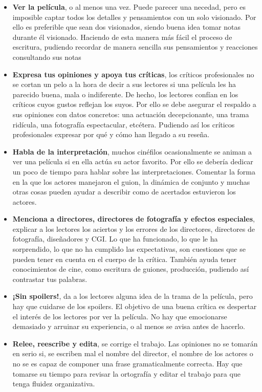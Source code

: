 \begin{itemize}
\item \textbf{Ver la película}, o al menos una vez. Puede parecer una necedad, pero es imposible captar todos los detalles y pensamientos con un solo visionado. Por ello es preferible que sean dos visionados, siendo buena idea tomar notas durante él visionado. Haciendo de esta manera más fácil el proceso de escritura, pudiendo recordar de manera sencilla sus pensamientos y reacciones consultando sus notas 
\item \textbf{Expresa tus opiniones y apoya tus críticas}, los críticos profesionales no se cortan un pelo a la hora de decir a sus lectores si una película les ha parecido buena, mala o indiferente. De hecho, los lectores confían en los críticos cuyos gustos reflejan los suyos. Por ello se debe asegurar el respaldo a sus opiniones con datos concretos: una actuación decepcionante, una trama ridícula, una fotografía espectacular, etcétera. Pudiendo así los críticos profesionales expresar por qué y cómo han llegado a su reseña.
\item \textbf{Habla de la interpretación}, muchos cinéfilos ocasionalmente se animan a ver una película si en ella actúa su actor favorito. Por ello se debería dedicar un poco de tiempo para hablar sobre las interpretaciones. Comentar la forma en la que los actores manejaron el guion, la dinámica de conjunto y muchas otras cosas pueden ayudar a describir como de acertados estuvieron los actores.
\item \textbf{Menciona a directores, directores de fotografía y efectos especiales}, explicar a los lectores los aciertos y los errores de los directores, directores de fotografía, diseñadores y CGI. Lo que ha funcionado, lo que le ha sorprendido, lo que no ha cumplido las expectativas, son cuestiones que se pueden tener en cuenta en el cuerpo de la crítica. También ayuda tener conocimientos de cine, como escritura de guiones, producción, pudiendo así contrastar tus palabras.
\item \textbf{¡Sin spoilers!}, da a los lectores alguna idea de la trama de la película, pero hay que cuidarse de los spoilers. El objetivo de una buena crítica es despertar el interés de los lectores por ver la película. No hay que emocionarse demasiado y arruinar su experiencia, o al menos se avisa antes de hacerlo.
\item \textbf{Relee, reescribe y edita}, se corrige el trabajo. Las opiniones no se tomarán en serio si, se escriben mal el nombre del director, el nombre de los actores o no se es capaz de componer una frase gramaticalmente correcta. Hay que tomarse su tiempo para revisar la ortografía y editar el trabajo para que tenga fluidez organizativa.
\end{itemize}

